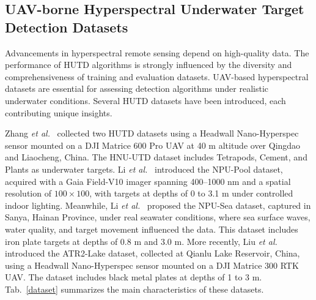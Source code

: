 \subsection{UAV-borne Hyperspectral Underwater Target Detection Datasets}
Advancements in hyperspectral remote sensing depend on high-quality data.  
The performance of HUTD algorithms is strongly influenced by the diversity and comprehensiveness of training and evaluation datasets.  
UAV-based hyperspectral datasets are essential for assessing detection algorithms under realistic underwater conditions.  
Several HUTD datasets have been introduced, each contributing unique insights.  
\par  
Zhang \emph{et al.}~\cite{Zhang2023} collected two HUTD datasets using a Headwall Nano-Hyperspec sensor mounted on a DJI Matrice 600 Pro UAV at 40 m altitude over Qingdao and Liaocheng, China.  
The HNU-UTD dataset includes Tetrapods, Cement, and Plants as underwater targets.  
Li \emph{et al.}~\cite{LiZheyong2023} introduced the NPU-Pool dataset, acquired with a Gaia Field-V10 imager spanning 400--1000 nm and a spatial resolution of $100 \times 100$, with targets at depths of 0 to 3.1 m under controlled indoor lighting.  
Meanwhile, Li \emph{et al.}~\cite{Li2023} proposed the NPU-Sea dataset, captured in Sanya, Hainan Province, under real seawater conditions, where sea surface waves, water quality, and target movement influenced the data.  
This dataset includes iron plate targets at depths of 0.8 m and 3.0 m.  
More recently, Liu \emph{et al.}~\cite{Liu2024} introduced the ATR2-Lake dataset, collected at Qianlu Lake Reservoir, China, using a Headwall Nano-Hyperspec sensor mounted on a DJI Matrice 300 RTK UAV.  
The dataset includes black metal plates at depths of 1 to 3 m.  
Tab.~\ref{dataset} summarizes the main characteristics of these datasets.
